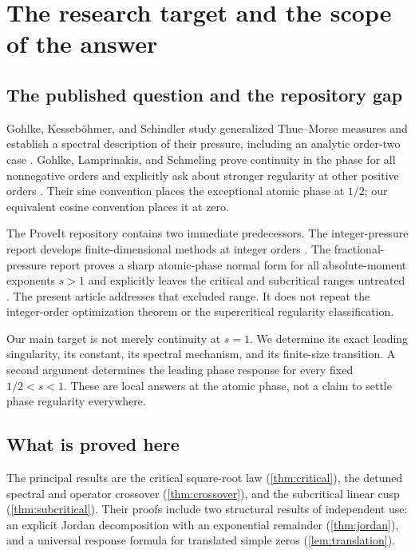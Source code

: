 \documentclass[11pt,a4paper]{article}
\numberwithin{equation}{section}
\theoremstyle{definition}
\theoremstyle{remark}
\begin{document}
\begingroup\small\setlength{\parskip}{0pt}\tableofcontents\endgroup
\newpage

\section{The research target and the scope of the answer}
\label{sec:intro}

\subsection{The published question and the repository gap}
Gohlke, Kesseb\"ohmer, and Schindler study generalized Thue--Morse
measures and establish a spectral description of their pressure, including
an analytic order-two case \cite{GKS}. Gohlke, Lamprinakis, and Schmeling
prove continuity in the phase for all nonnegative orders and explicitly
ask about stronger regularity at other positive orders
\cite[Theorems~2.2--2.3 and the following discussion]{GLS}.
Their sine convention places the exceptional atomic phase at $1/2$;
our equivalent cosine convention places it at zero.

The ProveIt repository contains two immediate predecessors. The
integer-pressure report develops finite-dimensional methods at integer
orders \cite{IntegerRepo}. The fractional-pressure report proves a
sharp atomic-phase normal form for all absolute-moment exponents $s>1$
and explicitly leaves the critical and subcritical ranges untreated
\cite{FractionalRepo}. The present article addresses that excluded range.
It does not repeat the integer-order optimization theorem or the
supercritical regularity classification.

Our main target is not merely continuity at $s=1$. We determine its exact
leading singularity, its constant, its spectral mechanism, and its
finite-size transition. A second argument determines the leading phase
response for every fixed $1/2<s<1$. These are local answers at the atomic
phase, not a claim to settle phase regularity everywhere.

\subsection{What is proved here}
The principal results are the critical square-root law
(\cref{thm:critical}), the detuned spectral and operator crossover
(\cref{thm:crossover}), and the subcritical linear cusp
(\cref{thm:subcritical}). Their proofs include two structural results of
independent use: an explicit Jordan decomposition with an exponential
remainder (\cref{thm:jordan}), and a universal response formula for
translated simple zeros (\cref{lem:translation}).
\end{document}
